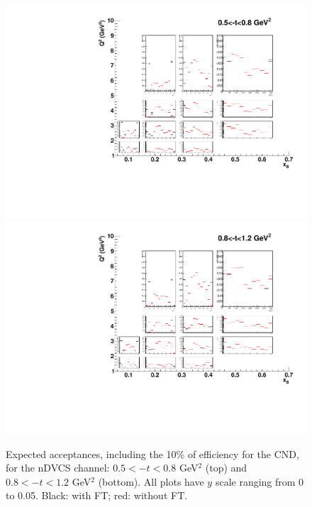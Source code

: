 \begin{figure}  
\begin{center}
\includegraphics[width=120mm]{plot_acc_3_FT_noFT_100days.pdf}
\includegraphics[width=120mm]{plot_acc_4_FT_noFT_100days.pdf}
\caption{Expected acceptances, including the 10\% of efficiency for the CND, for the nDVCS channel: $0.5<-t<0.8$ GeV$^2$ (top) and $0.8<-t<1.2$ GeV$^2$ (bottom). All plots have $y$ scale ranging from 0 to 0.05. Black: with FT; red: without FT. \label{acceptance_2}}
\end{center}
\end{figure}
